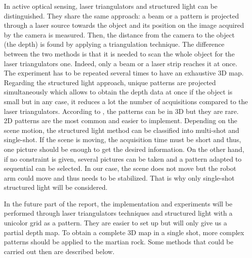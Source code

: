 In active optical sensing, laser triangulators and structured light can be distinguished. They share the same approach: a beam or a pattern is projected through a laser source towards the object and its position on the image acquired by the camera is measured. Then, the distance from the camera to the object (the depth) is found by applying a triangulation technique. The difference between the two methods is that it is needed to scan the whole object for the laser triangulators one. Indeed, only a beam or a laser strip reaches it at once. The experiment has to be repeated several times to have an exhaustive 3D map. Regarding the structured light approach, unique patterns are projected simultaneously which allows to obtain the depth data at once if the object is small but in any case, it reduces a lot the number of acquisitions compared to the laser triangulators. According to \cite{tuto}, the patterns can be in 3D but they are rare. 2D patterns are the most common and easier to implement. Depending on the scene motion, the structured light method can be classified into multi-shot and single-shot. If the scene is moving, the acquisition time must be short and thus, one picture should be enough to get the desired information. On the other hand, if no constraint is given, several pictures can be taken and a pattern adapted to sequential can be selected. In our case, the scene does not move but the robot arm could move and thus needs to be stabilized. That is why only single-shot structured light will be considered.

In the future part of the report, the implementation and experiments will be performed through laser triangulators techniques and structured light with a unicolor grid as a pattern. They are easier to set up but will only give us a partial depth map. To obtain a complete 3D map in a single shot, more complex patterns should be applied to the martian rock. Some methods that could be carried out then are described below. 